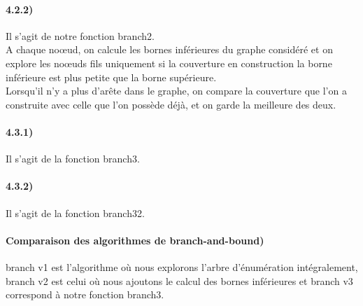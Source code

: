 \documentclass[12pt]{article}
\begin{document}
    \paragraph{4.2.2)}
        Il s'agit de notre fonction branch2. \\
        A chaque noœud, on calcule les bornes inférieures du graphe considéré et on explore les noœuds fils uniquement si la couverture en construction la borne inférieure est plus petite que la borne supérieure. \\
        Lorsqu'il n'y a plus d'arête dans le graphe, on compare la couverture que l'on a construite avec celle que l'on possède déjà, et on garde la meilleure des deux.
    
    \paragraph{4.3.1)}
        Il s'agit de la fonction branch3.

    \paragraph{4.3.2)}
        Il s'agit de la fonction branch32.

    \paragraph{Comparaison des algorithmes de branch-and-bound)}
        branch v1 est l'algorithme où nous explorons l'arbre d'énumération intégralement, branch v2 est celui où nous ajoutons le calcul des bornes inférieures et branch v3 correspond à notre fonction branch3.
\end{document}
